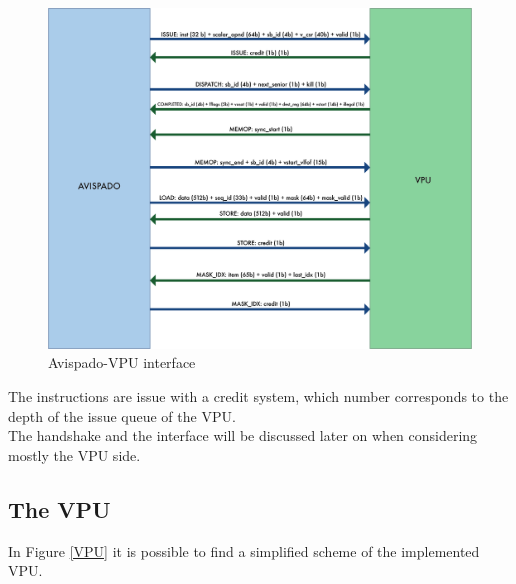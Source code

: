 \begin{figure}[H]
    \centering
    \includegraphics[scale = 0.6]{Chapter_1/img/avi-vpu.png}
    \caption{Avispado-VPU interface}
    \label{avi-vpu}
\end{figure}


The instructions are issue with a credit system, which number corresponds to the  depth of the issue queue of the VPU.\\

The handshake and the interface will be discussed later on when considering mostly the VPU side.



\subsection{The VPU}
In Figure \ref{VPU} it is possible to find a simplified scheme of the implemented VPU.\\

